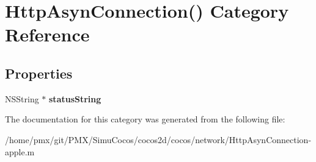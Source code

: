 \hypertarget{categoryHttpAsynConnection_07_08}{}\section{Http\+Asyn\+Connection() Category Reference}
\label{categoryHttpAsynConnection_07_08}
\subsection*{Properties}
\begin{DoxyCompactItemize}
\item 
\mbox{\label{categoryHttpAsynConnection_07_08_a40aa717cc4d54a8d72b446f2a8a214d4}} 
N\+S\+String $\ast$ {\bfseries status\+String}
\end{DoxyCompactItemize}


The documentation for this category was generated from the following file\+:\begin{DoxyCompactItemize}
\item 
/home/pmx/git/\+P\+M\+X/\+Simu\+Cocos/cocos2d/cocos/network/Http\+Asyn\+Connection-\/apple.\+m\end{DoxyCompactItemize}
